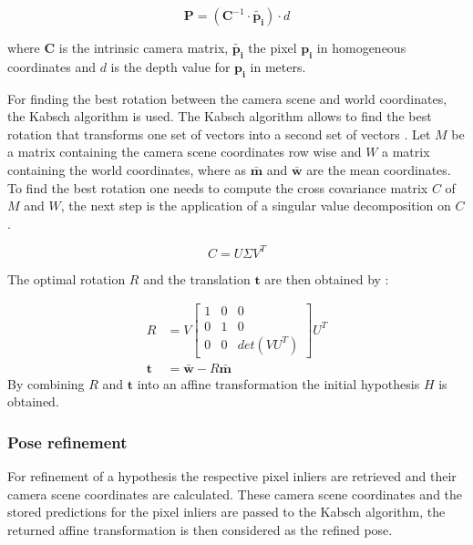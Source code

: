 \documentclass[final]{cvpr}
\begin{document}
\begin{equation}
	\boldsymbol{P} = (\boldsymbol{C}^{-1} \cdot \boldsymbol{\tilde{p_{i}}} ) \cdot d
\end{equation}

where $\boldsymbol{C}$ is the intrinsic camera matrix, $\boldsymbol{\tilde{p_{i}}}$ the pixel $\boldsymbol{p_{i}}$ in
homogeneous coordinates and $d$ is the depth value for $\boldsymbol{p_{i}}$ in meters. 

For finding the best
rotation between the camera scene and world coordinates, the Kabsch algorithm is used. The Kabsch algorithm allows to find the best rotation that transforms one set of vectors into a second set of vectors \cite{Kabsch1976}.
Let $M$ be a matrix containing the camera scene coordinates row wise and $W$ a matrix containing
the world coordinates, where as $\boldsymbol{\bar{m}}$ and $\boldsymbol{\bar{w}}$ are the mean coordinates.
To find the best rotation one needs to compute the cross covariance matrix $C$ of $M$ and $W$, the 
next step is the application of a singular value decomposition on $C$ \cite{Brachmann2020}.

\begin{equation}
	C = U \Sigma V^T
\end{equation}

The optimal rotation $R$ and the translation $\boldsymbol{t}$ are then obtained by \cite{Brachmann2020}:

\begin{equation}
	\begin{split}
		R &= V 
		\begin{bmatrix}
			1 & 0 & 0\\
			0 & 1 & 0\\
			0 & 0 & det(VU^T)
		\end{bmatrix}
		U^T \\
		\boldsymbol{t} &= \boldsymbol{\bar{w}} - R \boldsymbol{\bar{m}}
	\end{split}
\end{equation}
 By combining $R$ and $\boldsymbol{t}$ into an affine transformation the initial hypothesis $H$ is obtained.
 
\subsubsection{Pose refinement}
For refinement of a hypothesis the respective pixel inliers are retrieved and their camera scene 
coordinates are calculated. These camera scene coordinates and the stored predictions for the pixel inliers 
are passed to the Kabsch algorithm, the returned affine transformation is then considered as the refined pose.
\end{document}
